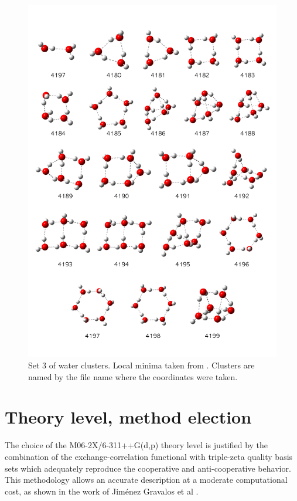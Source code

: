 \begin{figure}[h!p]
  \centering
  \includegraphics[width=1\textwidth]{4/plots/dibujitos/set3}
  \caption{Set 3 of water clusters. Local minima taken from \citet{Temelso2011}.
  Clusters are named by the file name where the coordinates were taken.}
  \label{Set3}
\end{figure}

\newpage

\section{Theory level, method election}\label{SecTheory}

The choice of the M06-2X/6-311++G(d,p) theory level is justified by the
combination of the exchange-correlation functional with triple-zeta quality
basis sets which adequately reproduce the cooperative and anti-cooperative behavior.
This methodology allows an accurate description at a moderate computational cost, as
shown in the work of Jiménez Gravalos et al .


